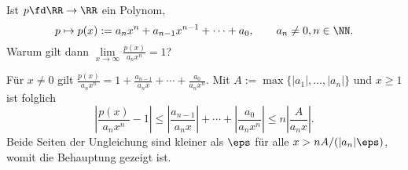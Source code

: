 \begin{frage}
  Ist $p\fd \RR\to \RR$ ein Polynom,
  \[
  p\mapsto p(x) := a_n x^n + a_{n-1}x^{n-1} + \cdots + a_0, 
  \qquad a_n\not=0, n\in\NN.
  \]
  Warum gilt dann $\lim\limits_{x\to\infty}\frac{p(x)}{a_nx^n}=1$?
\end{frage}

\begin{antwort}
  Für $x\not=0$ gilt $
  \frac{p(x)}{a_nx^n} = 1+ \frac{a_{n-1}}{a_nx} + \cdots + 
  \frac{a_0}{a_nx^n}.$
  Mit $A:=\max\{ |a_1|, \ldots, |a_n| \}$ und $x\ge 1$ ist folglich
  \[
  \left| 
    \frac{p(x)}{a_nx^n} -1 
  \right| \le
  \left| \frac{a_{n-1}}{a_nx} \right| + \cdots + 
  \left| \frac{a_0}{a_nx^n} \right| \le n\left| \frac{A}{a_n x }\right|.  
  \]
  Beide Seiten der Ungleichung sind kleiner als 
  $\eps$ für alle $x>nA/(|a_n|\eps)$, womit die Behauptung gezeigt ist.
  \AntEnd
\end{antwort}








































































































